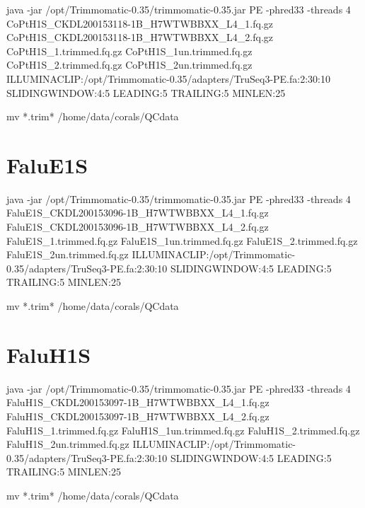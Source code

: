 \documentclass[]{article}
\newenvironment{Shaded}{\begin{snugshade}}{\end{snugshade}}
\newcommand{\ExtensionTok}[1]{#1}
\newcommand{\FunctionTok}[1]{\textcolor[rgb]{0.00,0.00,0.00}{#1}}
\newcommand{\NormalTok}[1]{#1}
\begin{document}
\begin{Shaded}
\begin{Highlighting}[]
\ExtensionTok{java}\NormalTok{ -jar /opt/Trimmomatic-0.35/trimmomatic-0.35.jar PE -phred33 -threads 4 CoPtH1S_CKDL200153118-1B_H7WTWBBXX_L4_1.fq.gz CoPtH1S_CKDL200153118-1B_H7WTWBBXX_L4_2.fq.gz CoPtH1S_1.trimmed.fq.gz CoPtH1S_1un.trimmed.fq.gz CoPtH1S_2.trimmed.fq.gz CoPtH1S_2un.trimmed.fq.gz ILLUMINACLIP:/opt/Trimmomatic-0.35/adapters/TruSeq3-PE.fa:2:30:10 SLIDINGWINDOW:4:5 LEADING:5 TRAILING:5 MINLEN:25}

\FunctionTok{mv}\NormalTok{ *.trim* /home/data/corals/QCdata}
\end{Highlighting}
\end{Shaded}

\hypertarget{falue1s}{%
\section{FaluE1S}\label{falue1s}}

\begin{Shaded}
\begin{Highlighting}[]
\ExtensionTok{java}\NormalTok{ -jar /opt/Trimmomatic-0.35/trimmomatic-0.35.jar PE -phred33 -threads 4 FaluE1S_CKDL200153096-1B_H7WTWBBXX_L4_1.fq.gz FaluE1S_CKDL200153096-1B_H7WTWBBXX_L4_2.fq.gz FaluE1S_1.trimmed.fq.gz FaluE1S_1un.trimmed.fq.gz FaluE1S_2.trimmed.fq.gz FaluE1S_2un.trimmed.fq.gz ILLUMINACLIP:/opt/Trimmomatic-0.35/adapters/TruSeq3-PE.fa:2:30:10 SLIDINGWINDOW:4:5 LEADING:5 TRAILING:5 MINLEN:25}

\FunctionTok{mv}\NormalTok{ *.trim* /home/data/corals/QCdata}
\end{Highlighting}
\end{Shaded}

\hypertarget{faluh1s}{%
\section{FaluH1S}\label{faluh1s}}

\begin{Shaded}
\begin{Highlighting}[]
\ExtensionTok{java}\NormalTok{ -jar /opt/Trimmomatic-0.35/trimmomatic-0.35.jar PE -phred33 -threads 4 FaluH1S_CKDL200153097-1B_H7WTWBBXX_L4_1.fq.gz FaluH1S_CKDL200153097-1B_H7WTWBBXX_L4_2.fq.gz FaluH1S_1.trimmed.fq.gz FaluH1S_1un.trimmed.fq.gz FaluH1S_2.trimmed.fq.gz FaluH1S_2un.trimmed.fq.gz ILLUMINACLIP:/opt/Trimmomatic-0.35/adapters/TruSeq3-PE.fa:2:30:10 SLIDINGWINDOW:4:5 LEADING:5 TRAILING:5 MINLEN:25}

\FunctionTok{mv}\NormalTok{ *.trim* /home/data/corals/QCdata}
\end{Highlighting}
\end{Shaded}
\end{document}
